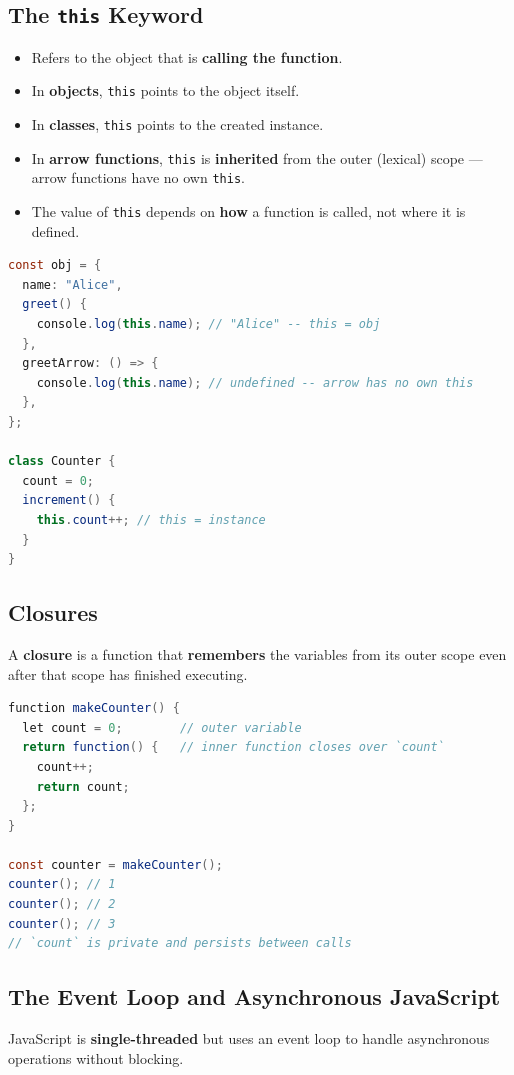 \documentclass[hidelinks]{article}
\begin{document}
\subsection{The \texttt{this} Keyword}
\begin{itemize}
  \item Refers to the object that is \textbf{calling the function}.
  \item In \textbf{objects}, \texttt{this} points to the object itself.
  \item In \textbf{classes}, \texttt{this} points to the created instance.
  \item In \textbf{arrow functions}, \texttt{this} is \textbf{inherited} from the outer (lexical) scope --- arrow functions have no own \texttt{this}.
  \item The value of \texttt{this} depends on \textbf{how} a function is called, not where it is defined.
\end{itemize}

\begin{lstlisting}[language=Java, caption={this in different contexts}]
const obj = {
  name: "Alice",
  greet() {
    console.log(this.name); // "Alice" -- this = obj
  },
  greetArrow: () => {
    console.log(this.name); // undefined -- arrow has no own this
  },
};

class Counter {
  count = 0;
  increment() {
    this.count++; // this = instance
  }
}
\end{lstlisting}

\subsection{Closures}
A \textbf{closure} is a function that \textbf{remembers} the variables from its outer scope even after that scope has finished executing.

\begin{lstlisting}[language=Java, caption={Closure example}]
function makeCounter() {
  let count = 0;        // outer variable
  return function() {   // inner function closes over `count`
    count++;
    return count;
  };
}

const counter = makeCounter();
counter(); // 1
counter(); // 2
counter(); // 3
// `count` is private and persists between calls
\end{lstlisting}

\subsection{The Event Loop and Asynchronous JavaScript}
JavaScript is \textbf{single-threaded} but uses an event loop to handle asynchronous operations without blocking.
\end{document}
